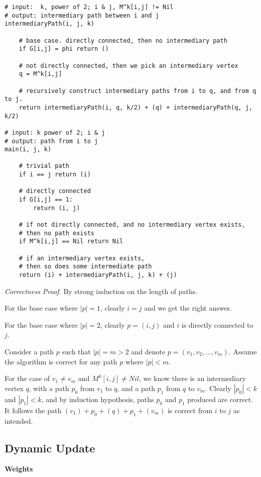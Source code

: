 \begin{verbatim}
# input:  k, power of 2; i & j, M^k[i,j] != Nil
# output: intermediary path between i and j
intermediaryPath(i, j, k)

    # base case. directly connected, then no intermediary path
    if G[i,j] = phi return ()
    
    # not directly connected, then we pick an intermediary vertex
    q = M^k[i,j]
    
    # recursively construct intermediary paths from i to q, and from q to j.
    return intermediaryPath(i, q, k/2) + (q) + intermediaryPath(q, j, k/2)

# input: k power of 2; i & j
# output: path from i to j
main(i, j, k)

    # trivial path
    if i == j return (i)

    # directly connected
    if G[i,j] == 1:
        return (i, j)

    # if not directly connected, and no intermediary vertex exists,
    # then no path exists
    if M^k[i,j] == Nil return Nil

    # if an intermediary vertex exists,
    # then so does some intermediate path
    return (i) + intermediaryPath(i, j, k) + (j)
\end{verbatim}

\textit{Correctness Proof.} By strong induction on the length of paths.

For the base case where $|p| = 1$, clearly $i = j$ and we get the right answer.

For the base case where $|p| = 2$, clearly $p = (i,j)$ and $i$ is directly connected to $j$.

Consider a path $p$ such that $|p| = m > 2$ and denote $p = (v_1, v_2, \dots, v_m)$. Assume the algorithm is correct for any path $p$ where $|p| < m$.

For the case of $v_1 \neq v_m$ and $M^k[i,j] \neq Nil$, we know there is an intermediary vertex $q$, with a path $p_0$ from $v_1$ to $q$, and a path $p_1$ from $q$ to $v_m$. Clearly $|p_0| < k$ and $|p_1| < k$, and by induction hypothesis, paths $p_0$ and $p_1$ produced are correct. It follows the path $(v_1) + p_0 + (q) + p_1 + (v_m)$ is correct from $i$ to $j$ as intended.


\subsection{Dynamic Update}

\textbf{Weights}

